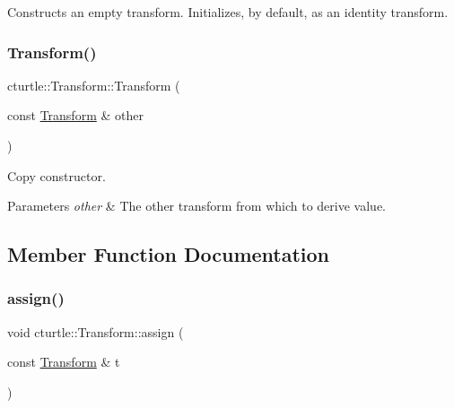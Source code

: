Constructs an empty transform. Initializes, by default, as an identity transform. \mbox{\label{classcturtle_1_1Transform_a007759937e9ad468e5ea41687571a417}} 
\subsubsection{\texorpdfstring{Transform()}{Transform()}\hspace{0.1cm}{\footnotesize\ttfamily [2/2]}}
{\footnotesize\ttfamily cturtle\+::\+Transform\+::\+Transform (\begin{DoxyParamCaption}\item[{const \hyperlink{classcturtle_1_1Transform}{Transform} \&}]{other }\end{DoxyParamCaption})\hspace{0.3cm}{\ttfamily [inline]}}



Copy constructor. 


\begin{DoxyParams}{Parameters}
{\em other} & The other transform from which to derive value. \\
\hline
\end{DoxyParams}


\subsection{Member Function Documentation}
\mbox{\label{classcturtle_1_1Transform_a5eb270c2614cc18c23623b24feb6968e}} 
\subsubsection{\texorpdfstring{assign()}{assign()}}
{\footnotesize\ttfamily void cturtle\+::\+Transform\+::assign (\begin{DoxyParamCaption}\item[{const \hyperlink{classcturtle_1_1Transform}{Transform} \&}]{t }\end{DoxyParamCaption})\hspace{0.3cm}{\ttfamily [inline]}}



